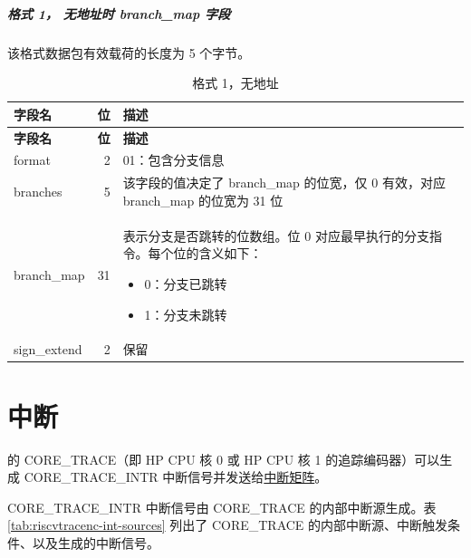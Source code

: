 \documentclass[main\_\_CN.tex]{subfiles}
\begin{document}
 \subparagraph{格式 1， 无地址时 branch\_map 字段}

该格式数据包有效载荷的长度为 5 个字节。
\begin{longtable}[c]{ |l|r|L{10cm}| }
    \caption{格式 1，无地址}
    \label{riscvtracenc-format-1-wo-address}
    \\\hline{}
    \textbf{字段名} & \textbf{位} & \textbf{描述} \\\hline
    \endfirsthead
    \textbf{字段名} & \textbf{位} & \textbf{描述} \\\hline
    \endhead
    \endfoot
    \endlastfoot

    format & 2 & 01：包含分支信息 \\\hline
    branches & 5 & 该字段的值决定了 branch\_map 的位宽，仅 0 有效，对应 branch\_map 的位宽为 31 位 \\\hline

    branch\_map & 31 & 表示分支是否跳转的位数组。位 0 对应最早执行的分支指令。每个位的含义如下：
    \begin{itemize}
        \item 0：分支已跳转
        \item 1：分支未跳转
    \vspace{-1.5em}
    \end{itemize}
    \\\hline

    sign\_extend & 2 & 保留 \\\hline
 \end{longtable}


\section{中断}

\chipname{} 的 CORE\_TRACE（即 HP CPU 核 0 或 HP CPU 核 1 的追踪编码器）可以生成 CORE\_TRACE\_INTR 中断信号并发送给\hyperref[mod:intmtrx]{中断矩阵}。

CORE\_TRACE\_INTR 中断信号由 CORE\_TRACE 的内部中断源生成。表 \ref{tab:riscvtracenc-int-sources} 列出了 CORE\_TRACE 的内部中断源、中断触发条件、以及生成的中断信号。
\end{document}
